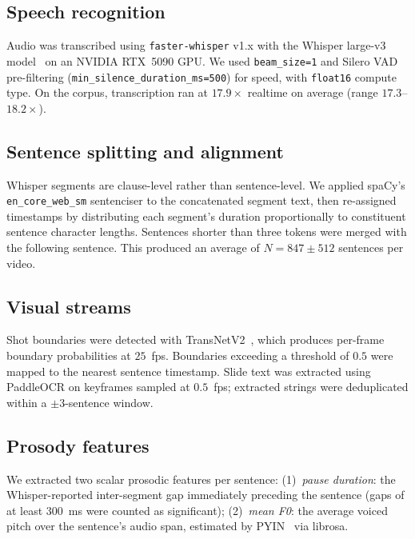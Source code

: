 \subsection{Speech recognition}

Audio was transcribed using \texttt{faster-whisper} v1.x with the
Whisper large-v3 model~\cite{radford2023robust} on an NVIDIA RTX~5090 GPU.
We used \texttt{beam\_size=1} and Silero VAD pre-filtering
(\texttt{min\_silence\_duration\_ms=500}) for speed, with \texttt{float16}
compute type.
On the \dataset{} corpus, transcription ran at $17.9\times$ realtime on average
(range $17.3$--$18.2\times$).

\subsection{Sentence splitting and alignment}

Whisper segments are clause-level rather than sentence-level.
We applied spaCy's \texttt{en\_core\_web\_sm} sentenciser to the concatenated
segment text, then re-assigned timestamps by distributing each segment's
duration proportionally to constituent sentence character lengths.
Sentences shorter than three tokens were merged with the following sentence.
This produced an average of $N = 847 \pm 512$ sentences per video.

\subsection{Visual streams}

Shot boundaries were detected with TransNetV2~\cite{soucek2020transnet},
which produces per-frame boundary probabilities at $25$~fps.
Boundaries exceeding a threshold of $0.5$ were mapped to the nearest sentence
timestamp.
Slide text was extracted using PaddleOCR on keyframes sampled at $0.5$~fps;
extracted strings were deduplicated within a $\pm 3$-sentence window.

\subsection{Prosody features}

We extracted two scalar prosodic features per sentence:
(1)~\emph{pause duration}: the Whisper-reported inter-segment gap immediately
preceding the sentence (gaps of at least 300~ms were counted as significant);
(2)~\emph{mean F0}: the average voiced pitch over the sentence's audio span,
estimated by PYIN~\cite{mauch2014pyin} via librosa.

